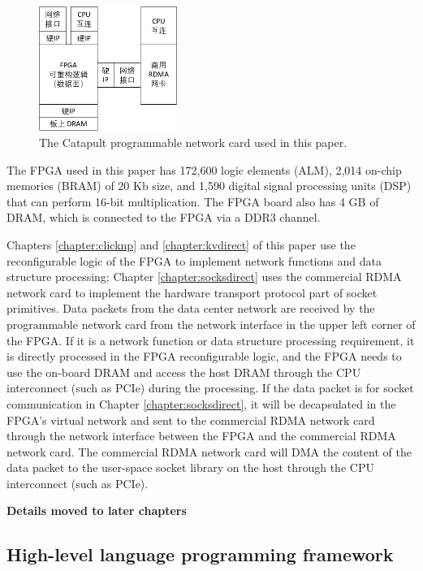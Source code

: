 \begin{figure}[htbp]
	\centering
	\includegraphics[width=0.4\textwidth]{figures/smartnic-current.pdf}
	\caption{The Catapult programmable network card used in this paper.}
	\label{arch:fig:my-smartnic-current}
\end{figure}

The FPGA used in this paper has 172,600 logic elements (ALM), 2,014 on-chip memories (BRAM) of 20 Kb size, and 1,590 digital signal processing units (DSP) that can perform 16-bit multiplication. The FPGA board also has 4 GB of DRAM, which is connected to the FPGA via a DDR3 channel.

Chapters \ref{chapter:clicknp} and \ref{chapter:kvdirect} of this paper use the reconfigurable logic of the FPGA to implement network functions and data structure processing; Chapter \ref{chapter:socksdirect} uses the commercial RDMA network card to implement the hardware transport protocol part of socket primitives.
Data packets from the data center network are received by the programmable network card from the network interface in the upper left corner of the FPGA. If it is a network function or data structure processing requirement, it is directly processed in the FPGA reconfigurable logic, and the FPGA needs to use the on-board DRAM and access the host DRAM through the CPU interconnect (such as PCIe) during the processing.
If the data packet is for socket communication in Chapter \ref{chapter:socksdirect}, it will be decapsulated in the FPGA's virtual network and sent to the commercial RDMA network card through the network interface between the FPGA and the commercial RDMA network card.
The commercial RDMA network card will DMA the content of the data packet to the user-space socket library on the host through the CPU interconnect (such as PCIe).

\iffalse
\textbf{Details moved to later chapters}


\subsection{High-level language programming framework}

